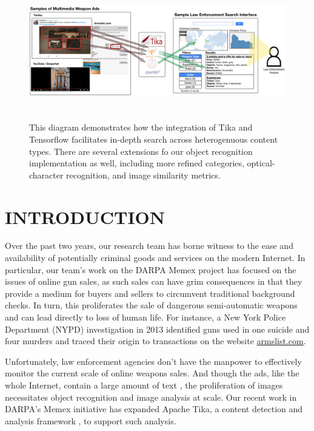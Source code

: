 \begin{figure}[!t]
  \centering
        \includegraphics[width=\textwidth,height=6cm]{interface-diagram}
        \caption{This diagram demonstrates how the integration of Tika and Tensorflow facilitates in-depth search across heterogenuous content types. There are several extensions fo our object recognition implementation as well, including more refined categories, optical-character recognition, and image similarity metrics.}
        \label{fig:interface-diagram}
\end{figure}
\section{INTRODUCTION}
Over the past two years, our research team has borne witness to the ease and availability of potentially criminal goods and services on the modern Internet. In particular, our team's work on the DARPA Memex project has focused on the issues of online gun sales, as such sales can have grim consequences in that they provide a medium for buyers and sellers to circumvent traditional background checks. In turn, this proliferates the sale of dangerous semi-automatic weapons and can lead directly to loss of human life. For instance, a New York Police Department (NYPD) investigation in 2013 identified guns used in one suicide and four murders and traced their origin to transactions on the website \url{armslist.com}\cite{raja_2016}. 

Unfortunately, law enforcement agencies don't have the manpower to effectively monitor the current scale of online weapons sales. And though the ads, like the whole Internet, contain a large amount of text \cite{mphillips-EOT2012}, the proliferation of images necessitates object recognition and image analysis at scale. Our recent work in DARPA's Memex initiative has expanded Apache Tika, a content detection and analysis framework \cite{mattmann2011tika}, to support such analysis.

